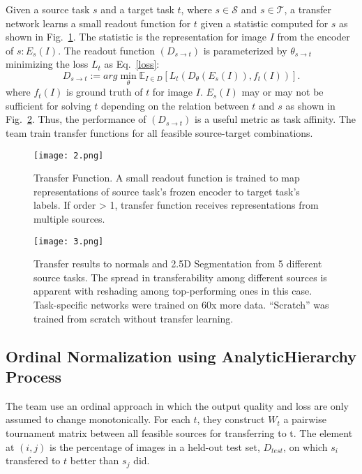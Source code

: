 \documentclass[10pt,twocolumn,letterpaper]{article}
\begin{document}
Given a source task $s$ and a target task $t$, where $s\in \mathcal{S}$ and $s\in \mathcal{T}$, a transfer network learns a small readout function for $t$ given a statistic computed for $s$ as shown in Fig.~\ref{fig:2}. The statistic is the representation for image $I$ from the encoder of $s: E_s(I)$. The readout function $(D_{s\to t})$ is parameterized by $\theta_{s\to t}$ minimizing the loss $L_t$ as Eq.~\ref{loss}:
\begin{equation}
D_{s\to t}:=arg \min_{\theta} \mathbb{E}_{I\in D}[L_t(D_\theta(E_s(I)),f_t(I))].   \label{loss}
\end{equation}
where $f_t(I)$ is ground truth of $t$ for image $I$. $E_s(I)$ may or may not be sufficient for solving $t$ depending on the relation between $t$ and $s$ as shown in Fig.~\ref{fig:3}. Thus, the performance of $(D_{s\to t})$ is a useful metric as task affinity. The team train transfer functions for all feasible source-target combinations.

\begin{figure}
	\begin{center}
		\texttt{[image: 2.png]}
	\end{center}
	\caption{Transfer Function. A small readout function is trained to map representations of source task's frozen encoder to target task's labels. If order > 1, transfer function receives representations from multiple sources.}
	\label{fig:2}
\end{figure}

\begin{figure}
	\begin{center}
		\texttt{[image: 3.png]}
	\end{center}
	\caption{Transfer results to normals and 2.5D Segmentation from 5 different source tasks. The spread in transferability among different sources is apparent with reshading among top-performing ones in this case. Task-specific networks were trained on 60x more data. ``Scratch'' was trained from scratch without transfer learning.}
	\label{fig:3}
\end{figure}

\subsection{Ordinal Normalization using AnalyticHierarchy Process}

The team use an ordinal approach in which the output quality and loss are only assumed to change monotonically. For each $t$, they construct $W_t$ a pairwise tournament matrix between all feasible sources for transferring to t. The element at $(i,j)$ is the percentage of images in a held-out test set, $D_{test}$, on which $s_i$ transfered to $t$ better than $s_j$ did.
\end{document}

